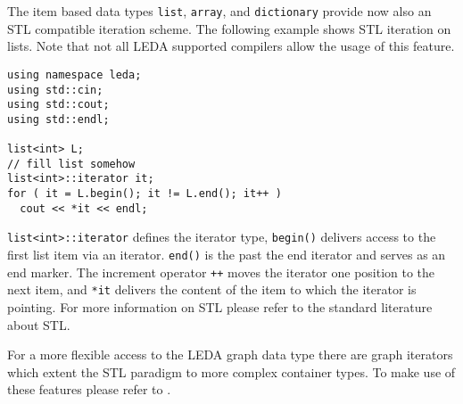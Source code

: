 The item based data types \verb!list!, \verb!array!, and \verb!dictionary!
provide now also an STL compatible iteration scheme. The following example
shows STL iteration on lists. Note that not all LEDA supported compilers allow
the usage of this feature. 
\begin{verbatim}
using namespace leda;
using std::cin;
using std::cout;
using std::endl;

list<int> L;
// fill list somehow
list<int>::iterator it;
for ( it = L.begin(); it != L.end(); it++ )
  cout << *it << endl;
\end{verbatim} 
\verb!list<int>::iterator! defines the iterator type, \verb!begin()! delivers
access to the first list item via an iterator. \verb!end()! is the past the end
iterator and serves as an end marker. The increment operator \verb!++! moves 
the iterator one position to the next item, and \verb!*it! delivers the
content of the item to which the iterator is pointing. For more information
on STL please refer to the standard literature about STL. 

For a more flexible access to the LEDA graph data type there are graph
iterators which extent the STL paradigm to more complex container types.
To make use of these features please refer to .
